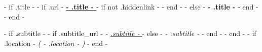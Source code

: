 {{- if .title -}}
{{- if .url -}}
	\textbf{\href{ {{- .url -}} }{ {{- .title -}} }}
	{{- if not .hiddenlink -}}
		{ }
	{{- end -}}
{{- else -}}
	\textbf{ {{- .title -}} }
{{- end -}}
{{- end -}}

{{- if .subtitle -}}
	{{- if .subtitle_url -}}
		\textit{ - \href{ {{- .subtitle_url -}} }{ {{ .subtitle -}} } }
	{{- else -}}
		\textit{ - {{ .subtitle -}} }
	{{- end -}}
{{- end -}}
{{- if .location -}}
	\textit{ ( {{- .location -}} ) }
{{- end -}}